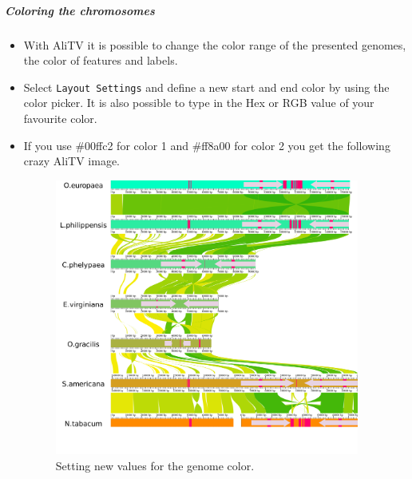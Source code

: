 \documentclass[a4paper]{scrartcl}
\begin{document}
\subparagraph{Coloring the chromosomes}
\begin{itemize}
	\item With AliTV it is possible to change the color range of the presented genomes, the color of features and labels.
	\item Select \texttt{Layout Settings} and define a new start and end color by using the color picker. It is also possible to type in the Hex or RGB value of your favourite color.
	\item If you use \#00ffc2 for color 1 and \#ff8a00 for color 2 you get the following crazy AliTV image.
	\begin{figure}[H]
		\centering
		\includegraphics[width=10cm]{crazy.png}
		\caption{Setting new values for the genome color.}
	\end{figure}
\end{itemize}
\end{document}
